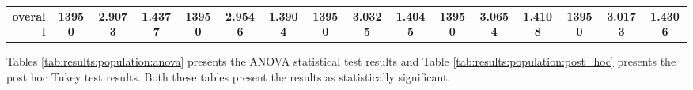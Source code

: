\begin{table}[htbp]
{\begin{tabular}{rccccccccccccccc}
                  \midrule
                  \textbf{overall}                    & \textbf{13950}                          & \cellcolor[rgb]{ .776,  .937,  .808}\textcolor[rgb]{ 0,  .38,  0}{\textbf{2.9073}} & \textbf{1.4377} & \textbf{13950}                  & \textbf{2.9546}                                                           & \textbf{1.3904} & \textbf{13950}                  & \textbf{3.0325} & \textbf{1.4045} & \textbf{13950}                  & \textbf{3.0654}                                                           & \textbf{1.4108} & \textbf{13950}                  & \textbf{3.0173}                                                           & \textbf{1.4306} \\
            \end{tabular}%
      }
\end{table}%

Tables \ref{tab:results:population:anova} presents the ANOVA statistical test results and Table \ref{tab:results:population:post_hoc} presents the post hoc Tukey test results. Both these tables present the results as statistically significant.


\begin{table}[htbp]
      \centering
      \caption{ANOVA - Rank - BHH Variant: Population}
      \label{tab:results:population:anova}%
      \par\bigskip

\end{table}


